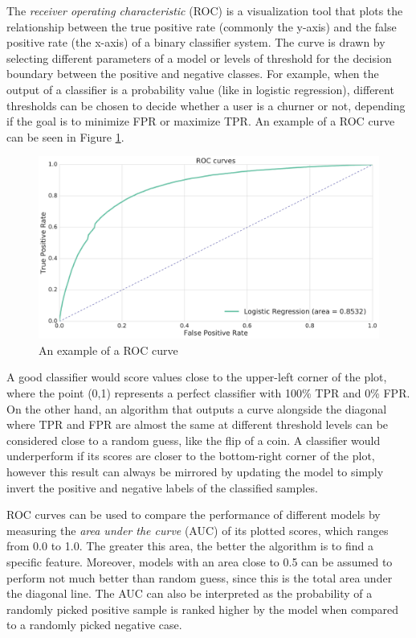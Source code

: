 \documentclass{kththesis}
\begin{document}
The \emph{receiver operating characteristic} (ROC) is a visualization tool that plots the relationship between the true positive rate (commonly the y-axis) and the false positive rate (the x-axis) of a binary classifier system. The curve is drawn by selecting different parameters of a model or levels of threshold for the decision boundary between the positive and negative classes. For example, when the output of a classifier is a probability value (like in logistic regression), different thresholds can be chosen to decide whether a user is a churner or not, depending if the goal is to minimize FPR or maximize TPR. An example of a ROC curve can be seen in Figure \ref{fig:roc_example}.

\begin{figure}[h]
    \centering
    \includegraphics[width=1.0\textwidth,keepaspectratio]{figures/roc_example.pdf}
    \caption{An example of a ROC curve}
    \label{fig:roc_example}
\end{figure}

A good classifier would score values close to the upper-left corner of the plot, where the point (0,1) represents a perfect classifier with 100\% TPR and 0\% FPR. On the other hand, an algorithm that outputs a curve alongside the diagonal where TPR and FPR are almost the same at different threshold levels can be considered close to a random guess, like the flip of a coin. A classifier would underperform if its scores are closer to the bottom-right corner of the plot, however this result can always be mirrored by updating the model to simply invert the positive and negative labels of the classified samples.

ROC curves can be used to compare the performance of different models by measuring the \emph{area under the curve} (AUC) of its plotted scores, which ranges from 0.0 to 1.0. The greater this area, the better the algorithm is to find a specific feature. Moreover, models with an area close to 0.5 can be assumed to perform not much better than random guess, since this is the total area under the diagonal line. The AUC can also be interpreted as the probability of a randomly picked positive sample is ranked higher by the model when compared to a randomly picked negative case.
\end{document}
